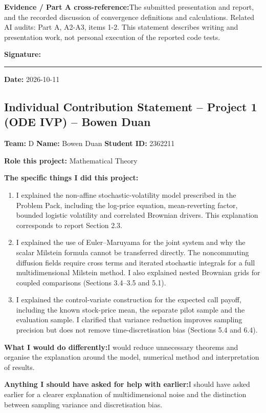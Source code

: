 \textbf{Evidence / Part A cross-reference:}\newline The submitted presentation and report, and the recorded discussion of convergence definitions and calculations. Related AI audits: Part A, A2-A3, items 1-2. This statement describes writing and presentation work, not personal execution of the reported code tests.

\vspace{8mm}\textbf{Signature:} \rule{5cm}{.3pt} \qquad \textbf{Date:} 2026-10-11
\clearpage
\subsection*{Individual Contribution Statement -- Project 1 (ODE IVP) -- Bowen Duan}
\textbf{Team:} D \quad \textbf{Name:} Bowen Duan \quad \textbf{Student ID:} 2362211

\textbf{Role this project:} Mathematical Theory

\textbf{The specific things I did this project:}
\begin{enumerate}[leftmargin=*]
\item I explained the non-affine stochastic-volatility model prescribed in the Problem Pack, including the log-price equation, mean-reverting factor, bounded logistic volatility and correlated Brownian drivers. This explanation corresponds to report Section 2.3.
\item I explained the use of Euler--Maruyama for the joint system and why the scalar Milstein formula cannot be transferred directly. The noncommuting diffusion fields require cross terms and iterated stochastic integrals for a full multidimensional Milstein method. I also explained nested Brownian grids for coupled comparisons (Sections 3.4--3.5 and 5.1).
\item I explained the control-variate construction for the expected call payoff, including the known stock-price mean, the separate pilot sample and the evaluation sample. I clarified that variance reduction improves sampling precision but does not remove time-discretisation bias (Sections 5.4 and 6.4).
\end{enumerate}

\textbf{What I would do differently:}\newline I would reduce unnecessary theorems and organise the explanation around the model, numerical method and interpretation of results.

\textbf{Anything I should have asked for help with earlier:}\newline I should have asked earlier for a clearer explanation of multidimensional noise and the distinction between sampling variance and discretisation bias.


